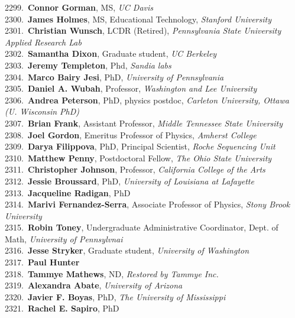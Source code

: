 2299.~{\bf Connor Gorman}, MS, {\sl UC Davis} \\
2300.~{\bf James Holmes}, MS, Educational Technology, {\sl Stanford University} \\
2301.~{\bf Christian Wunsch}, LCDR (Retired), {\sl Pennsylvania State University Applied Research Lab} \\
2302.~{\bf Samantha Dixon}, Graduate student, {\sl UC Berkeley} \\
2303.~{\bf Jeremy Templeton}, Phd, {\sl Sandia labs} \\
2304.~{\bf Marco Bairy Jesi}, PhD, {\sl University of Pennsylvania} \\
2305.~{\bf Daniel A. Wubah}, Professor, {\sl Washington and Lee University} \\
2306.~{\bf Andrea Peterson}, PhD, physics postdoc, {\sl Carleton University, Ottawa (U. Wisconsin PhD)} \\
2307.~{\bf Brian Frank}, Assistant Professor, {\sl Middle Tennessee State University} \\
2308.~{\bf Joel Gordon}, Emeritus Professor of Physics, {\sl Amherst College} \\
2309.~{\bf Darya Filippova}, PhD, Principal Scientist, {\sl Roche Sequencing Unit} \\
2310.~{\bf Matthew Penny}, Postdoctoral Fellow, {\sl The Ohio State University} \\
2311.~{\bf Christopher Johnson}, Professor, {\sl California College of the Arts} \\
2312.~{\bf Jessie Broussard}, PhD, {\sl University of Louisiana at Lafayette} \\
2313.~{\bf Jacqueline Radigan}, PhD \\
2314.~{\bf Marivi Fernandez-Serra}, Associate Professor of Physics, {\sl Stony Brook University } \\
2315.~{\bf Robin Toney}, Undergraduate Administrative Coordinator, Dept. of Math, {\sl University of Pennsylvnai} \\
2316.~{\bf Jesse Stryker}, Graduate student, {\sl University of Washington} \\
2317.~{\bf Paul Hunter} \\
2318.~{\bf Tammye Mathews}, ND, {\sl Restored by Tammye Inc.} \\
2319.~{\bf Alexandra Abate}, {\sl University of Arizona} \\
2320.~{\bf Javier F. Boyas}, PhD, {\sl The University of Mississippi } \\
2321.~{\bf Rachel E. Sapiro}, PhD \\
